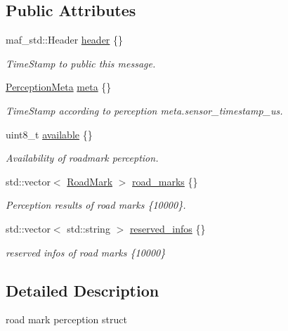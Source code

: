 \subsection*{Public Attributes}
\begin{DoxyCompactItemize}
\item 
maf\+\_\+std\+::\+Header \hyperlink{structmaf__perception__interface_1_1RoadMarkPerception_a0c850e30926325b583f16206cef5c0ba}{header} \{\}
\begin{DoxyCompactList}\small\item\em Time\+Stamp to public this message. \end{DoxyCompactList}\item 
\hyperlink{structmaf__perception__interface_1_1PerceptionMeta}{Perception\+Meta} \hyperlink{structmaf__perception__interface_1_1RoadMarkPerception_a303f00fbc2f0ec063914c0ef7e69e468}{meta} \{\}
\begin{DoxyCompactList}\small\item\em Time\+Stamp according to perception meta.\+sensor\+\_\+timestamp\+\_\+us. \end{DoxyCompactList}\item 
uint8\+\_\+t \hyperlink{structmaf__perception__interface_1_1RoadMarkPerception_a3ea103da0d702a3fe92bb8d030e43a44}{available} \{\}
\begin{DoxyCompactList}\small\item\em Availability of roadmark perception. \end{DoxyCompactList}\item 
std\+::vector$<$ \hyperlink{structmaf__perception__interface_1_1RoadMark}{Road\+Mark} $>$ \hyperlink{structmaf__perception__interface_1_1RoadMarkPerception_a8988519fe6bfdf6968a9c2a547935524}{road\+\_\+marks} \{\}
\begin{DoxyCompactList}\small\item\em Perception results of road marks \{10000\}. \end{DoxyCompactList}\item 
std\+::vector$<$ std\+::string $>$ \hyperlink{structmaf__perception__interface_1_1RoadMarkPerception_a0596838f341b23cf60c6a166ba30d5a9}{reserved\+\_\+infos} \{\}
\begin{DoxyCompactList}\small\item\em reserved infos of road marks \{10000\} \end{DoxyCompactList}\end{DoxyCompactItemize}


\subsection{Detailed Description}
road mark perception struct 

